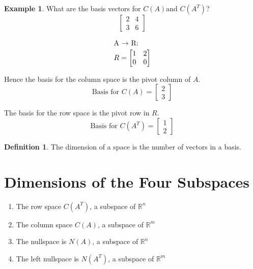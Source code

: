 \documentclass[12pt, letterpaper]{article}
\newcommand{\R}[1]{$\mathbb{R}^{#1}$}
\newcommand{\DefinitionSpace}{\vspace{15px}}
\theoremstyle{definition}
\newtheorem{definition}{Definition}[section]
\newtheorem{example}{Example}
\begin{document}
		\begin{example}
			What are the basis vectors for $C(A) \text{and } C(A^T)$?
				$$\begin{bmatrix} 2 & 4 \\ 3 & 6 \end{bmatrix}$$
				
				\begin{gather*}
					\intertext{A $\rightarrow$ R:}
						R = \begin{bmatrix} 1 & 2 \\ 0 & 0 \end{bmatrix}
				\end{gather*}
			
			\noindent Hence the basis for the column space is the pivot column of $A$.
				\begin{equation*}
					\text{Basis for } C(A) = \begin{bmatrix} 2 \\ 3 \end{bmatrix}
				\end{equation*}
				
			\noindent The basis for the row space is the pivot row in $R$.
				\begin{equation*}
					\text{Basis for } C(A^T) = \begin{bmatrix} 1 \\ 2 \end{bmatrix}
				\end{equation*}
		\end{example}
	
	\DefinitionSpace
		\begin{definition}
			The dimension of a space is the number of vectors in a basis.
		\end{definition}
	\DefinitionSpace
	
	
	
\section{Dimensions of the Four Subspaces}
	\begin{enumerate}
		\item The row space $C(A^T)$, a subspace of \R{n}
		\item The column space $C(A)$, a subspace of \R{m}
		\item The nullspace is $N(A)$, a subspace of \R{n}
		\item The left nullspace is $N(A^T)$, a subspace of \R{m}
	\end{enumerate}
	
\end{document}
